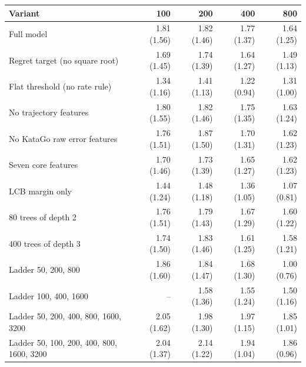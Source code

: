 \begin{tabular}{lrrrr}
\toprule
Variant & 100 & 200 & 400 & 800 \\
\midrule
Full model & 1.81 (1.56) & 1.82 (1.46) & 1.77 (1.37) & 1.64 (1.25) \\
Regret target (no square root) & 1.69 (1.45) & 1.74 (1.39) & 1.64 (1.27) & 1.49 (1.13) \\
Flat threshold (no rate rule) & 1.34 (1.16) & 1.41 (1.13) & 1.22 (0.94) & 1.31 (1.00) \\
No trajectory features & 1.80 (1.55) & 1.82 (1.46) & 1.75 (1.35) & 1.63 (1.24) \\
No KataGo raw error features & 1.76 (1.51) & 1.87 (1.50) & 1.70 (1.31) & 1.62 (1.23) \\
Seven core features & 1.70 (1.46) & 1.73 (1.39) & 1.65 (1.27) & 1.62 (1.23) \\
LCB margin only & 1.44 (1.24) & 1.48 (1.18) & 1.36 (1.05) & 1.07 (0.81) \\
80 trees of depth 2 & 1.76 (1.51) & 1.79 (1.43) & 1.67 (1.29) & 1.60 (1.22) \\
400 trees of depth 3 & 1.74 (1.50) & 1.83 (1.46) & 1.61 (1.25) & 1.58 (1.21) \\
Ladder 50, 200, 800 & 1.86 (1.60) & 1.84 (1.47) & 1.68 (1.30) & 1.00 (0.76) \\
Ladder 100, 400, 1600 & -- & 1.58 (1.36) & 1.55 (1.24) & 1.50 (1.16) \\
Ladder 50, 200, 400, 800, 1600, 3200 & 2.05 (1.62) & 1.98 (1.30) & 1.97 (1.15) & 1.85 (1.01) \\
Ladder 50, 100, 200, 400, 800, 1600, 3200 & 2.04 (1.37) & 2.14 (1.22) & 1.94 (1.04) & 1.86 (0.96) \\
\bottomrule
\end{tabular}
